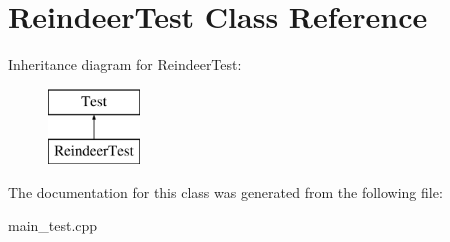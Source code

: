 \hypertarget{class_reindeer_test}{}\section{Reindeer\+Test Class Reference}
\label{class_reindeer_test}
Inheritance diagram for Reindeer\+Test\+:\begin{figure}[H]
\begin{center}
\leavevmode
\includegraphics[height=2.000000cm]{class_reindeer_test}
\end{center}
\end{figure}


The documentation for this class was generated from the following file\+:\begin{DoxyCompactItemize}
\item 
main\+\_\+test.\+cpp\end{DoxyCompactItemize}
